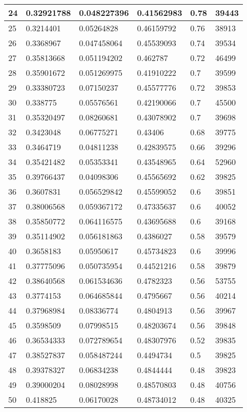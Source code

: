 \begin{longtable}{|l|l|l|l|l|l|}
24 & 0.32921788 & 0.048227396 & 0.41562983 & 0.78 & 39443 \\ \hline 
25 & 0.3214401 & 0.05264828 & 0.46159792 & 0.76 & 38913 \\ \hline 
26 & 0.3368967 & 0.047458064 & 0.45539093 & 0.74 & 39534 \\ \hline 
27 & 0.35813668 & 0.051194202 & 0.462787 & 0.72 & 46499 \\ \hline 
28 & 0.35901672 & 0.051269975 & 0.41910222 & 0.7 & 39599 \\ \hline 
29 & 0.33380723 & 0.07150237 & 0.45577776 & 0.72 & 39853 \\ \hline 
30 & 0.338775 & 0.05576561 & 0.42190066 & 0.7 & 45500 \\ \hline 
31 & 0.35320497 & 0.08260681 & 0.43078902 & 0.7 & 39698 \\ \hline 
32 & 0.3423048 & 0.06775271 & 0.43406 & 0.68 & 39775 \\ \hline 
33 & 0.3464719 & 0.04811238 & 0.42839575 & 0.66 & 39296 \\ \hline 
34 & 0.35421482 & 0.05353341 & 0.43548965 & 0.64 & 52960 \\ \hline 
35 & 0.39766437 & 0.04098306 & 0.45565692 & 0.62 & 39825 \\ \hline 
36 & 0.3607831 & 0.056529842 & 0.45599052 & 0.6 & 39851 \\ \hline 
37 & 0.38006568 & 0.059367172 & 0.47335637 & 0.6 & 40052 \\ \hline 
38 & 0.35850772 & 0.064116575 & 0.43695688 & 0.6 & 39168 \\ \hline 
39 & 0.35114902 & 0.056181863 & 0.4386027 & 0.58 & 39579 \\ \hline 
40 & 0.3658183 & 0.05950617 & 0.45734823 & 0.6 & 39996 \\ \hline 
41 & 0.37775096 & 0.050735954 & 0.44521216 & 0.58 & 39879 \\ \hline 
42 & 0.38640568 & 0.061534636 & 0.4782323 & 0.56 & 53755 \\ \hline 
43 & 0.3774153 & 0.064685844 & 0.4795667 & 0.56 & 40214 \\ \hline 
44 & 0.37968984 & 0.08336774 & 0.4804913 & 0.56 & 39967 \\ \hline 
45 & 0.3598509 & 0.07998515 & 0.48203674 & 0.56 & 39848 \\ \hline 
46 & 0.36534333 & 0.072789654 & 0.48307976 & 0.52 & 39835 \\ \hline 
47 & 0.38527837 & 0.058487244 & 0.4494734 & 0.5 & 39825 \\ \hline 
48 & 0.39378327 & 0.06834238 & 0.4844444 & 0.48 & 39823 \\ \hline 
49 & 0.39000204 & 0.08028998 & 0.48570803 & 0.48 & 40756 \\ \hline 
50 & 0.418825 & 0.06170028 & 0.48734012 & 0.48 & 40325 \\ \hline 
\end{longtable}